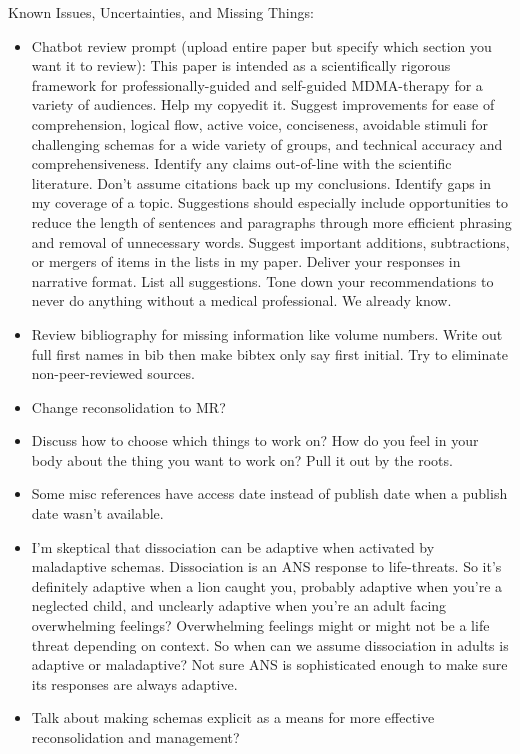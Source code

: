 \documentclass[12pt,letterpaper]{book}
\begin{document}
Known Issues, Uncertainties, and Missing Things:
\begin{itemize}
    \item Chatbot review prompt (upload entire paper but specify which section you want it to review):
        This paper is intended as a scientifically rigorous framework for professionally-guided and self-guided MDMA-therapy for a variety of audiences. Help my copyedit it.
        Suggest improvements for ease of comprehension, logical flow, active voice, conciseness, avoidable stimuli for challenging schemas for a wide variety of groups, and technical accuracy and comprehensiveness.
        Identify any claims out-of-line with the scientific literature. Don't assume citations back up my conclusions. Identify gaps in my coverage of a topic.
        Suggestions should especially include opportunities to reduce the length of sentences and paragraphs through more efficient phrasing and removal of unnecessary words.
        Suggest important additions, subtractions, or mergers of items in the lists in my paper.
        Deliver your responses in narrative format. List all suggestions.
        Tone down your recommendations to never do anything without a medical professional. We already know.
    \item Review bibliography for missing information like volume numbers. Write out full first names in bib then make bibtex only say first initial. Try to eliminate non-peer-reviewed sources.
    \item Change reconsolidation to MR?
    \item Discuss how to choose which things to work on? How do you feel in your body about the thing you want to work on? Pull it out by the roots.
    \item Some misc references have access date instead of publish date when a publish date wasn't available.
    \item I'm skeptical that dissociation can be adaptive when activated by maladaptive schemas. Dissociation is an ANS response to life-threats. So it's definitely adaptive when a lion caught you, probably adaptive when you're a neglected child, and unclearly adaptive when you're an adult facing overwhelming feelings? Overwhelming feelings might or might not be a life threat depending on context. So when can we assume dissociation in adults is adaptive or maladaptive? Not sure ANS is sophisticated enough to make sure its responses are always adaptive.
    \item Talk about making schemas explicit as a means for more effective reconsolidation and management?

\end{itemize}
\end{document}
